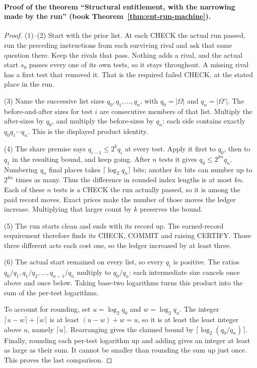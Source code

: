 \documentclass[11pt,twoside]{article}
\theoremstyle{thielethm}
\theoremstyle{thieledef}
\theoremstyle{thieledef}
\theoremstyle{thieledef}
\theoremstyle{thielethm}
\theoremstyle{thieleobs}
\theoremstyle{thielethm}
\begin{document}
\paragraph{Proof of the theorem ``Structural entitlement, with the narrowing made by the run'' (book Theorem~\ref{thm:ent-run-machine}).}
\begin{proof}
(1)--(2) Start with the prior list. At each CHECK the actual run passed,
run the preceding instructions from each surviving rival and ask that same
question there. Keep the rivals that pass. Nothing adds a rival, and the
actual start $s_0$ passes every one of its own tests, so it stays throughout.
A missing rival has a first test that removed it. That is the required
failed CHECK, at the stated place in the run.

(3) Name the successive list sizes $q_0,q_1,\ldots,q_n$, with $q_0=|\Omega|$
and $q_n=|\Omega'|$. The before-and-after sizes for test $i$ are consecutive
members of that list. Multiply the after-sizes by $q_0$, and multiply the
before-sizes by $q_n$: each side contains exactly
$q_0q_1\cdots q_n$. This is the displayed product identity.

(4) The share premise says $q_{i-1}\le 2^k q_i$ at every test. Apply it first
to $q_0$, then to $q_1$ in the resulting bound, and keep going. After $n$
tests it gives $q_0\le 2^{kn}q_n$. Numbering $q_n$ final places takes
$\lceil\log_2 q_n\rceil$ bits; another $kn$ bits can number up to $2^{kn}$
times as many. Thus the difference in rounded index lengths is at most
$kn$. Each of these $n$ tests is a CHECK the run actually passed, so it is
among the paid record moves. Exact prices make the number of those moves
the ledger increase. Multiplying that larger count by $k$ preserves the bound.

(5) The run starts clean and ends with its record up. The earned-record
requirement therefore finds its CHECK, COMMIT and raising CERTIFY. Those
three different acts each cost one, so the ledger increased by at least three.

(6) The actual start remained on every list, so every $q_i$ is positive.
The ratios $q_0/q_1,q_1/q_2,\ldots,q_{n-1}/q_n$ multiply to $q_0/q_n$:
each intermediate size cancels once above and once below. Taking base-two
logarithms turns this product into the sum of the per-test logarithms.

To account for rounding, set $u=\log_2 q_0$ and $w=\log_2 q_n$.
The integer $\lceil u-w\rceil+\lceil w\rceil$ is at least
$(u-w)+w=u$, so it is at least the least integer above $u$, namely
$\lceil u\rceil$. Rearranging gives the claimed bound by
$\lceil\log_2(q_0/q_n)\rceil$. Finally, rounding each per-test logarithm
up and adding gives an integer at least as large as their sum. It cannot
be smaller than rounding the sum up just once. This proves the last comparison.
\end{proof}
\end{document}
